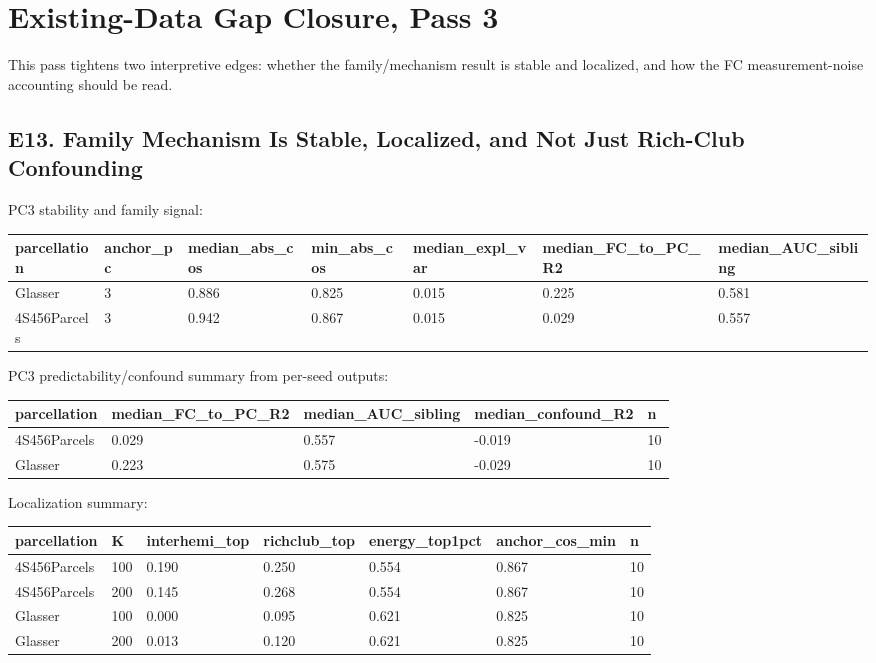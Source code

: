 \section{Existing-Data Gap Closure, Pass 3}\label{existing-data-gap-closure-pass-3}

This pass tightens two interpretive edges: whether the family/mechanism result is stable and localized, and how the FC measurement-noise accounting should be read.

\subsection{E13. Family Mechanism Is Stable, Localized, and Not Just Rich-Club Confounding}\label{e13-family-mechanism-is-stable-localized-and-not-just-rich-club-confounding}

PC3 stability and family signal:

{\def\LTcaptype{none} %
\begin{longtable}[]{@{}lllllll@{}}
\toprule\noalign{}
parcellation & anchor\_pc & median\_abs\_cos & min\_abs\_cos & median\_expl\_var & median\_FC\_to\_PC\_R2 & median\_AUC\_sibling \\
\midrule\noalign{}
\endhead
\bottomrule\noalign{}
\endlastfoot
Glasser & 3 & 0.886 & 0.825 & 0.015 & 0.225 & 0.581 \\
4S456Parcels & 3 & 0.942 & 0.867 & 0.015 & 0.029 & 0.557 \\
\end{longtable}
}

PC3 predictability/confound summary from per-seed outputs:

{\def\LTcaptype{none} %
\begin{longtable}[]{@{}lllll@{}}
\toprule\noalign{}
parcellation & median\_FC\_to\_PC\_R2 & median\_AUC\_sibling & median\_confound\_R2 & n \\
\midrule\noalign{}
\endhead
\bottomrule\noalign{}
\endlastfoot
4S456Parcels & 0.029 & 0.557 & -0.019 & 10 \\
Glasser & 0.223 & 0.575 & -0.029 & 10 \\
\end{longtable}
}

Localization summary:

{\def\LTcaptype{none} %
\begin{longtable}[]{@{}lllllll@{}}
\toprule\noalign{}
parcellation & K & interhemi\_top & richclub\_top & energy\_top1pct & anchor\_cos\_min & n \\
\midrule\noalign{}
\endhead
\bottomrule\noalign{}
\endlastfoot
4S456Parcels & 100 & 0.190 & 0.250 & 0.554 & 0.867 & 10 \\
4S456Parcels & 200 & 0.145 & 0.268 & 0.554 & 0.867 & 10 \\
Glasser & 100 & 0.000 & 0.095 & 0.621 & 0.825 & 10 \\
Glasser & 200 & 0.013 & 0.120 & 0.621 & 0.825 & 10 \\
\end{longtable}
}

